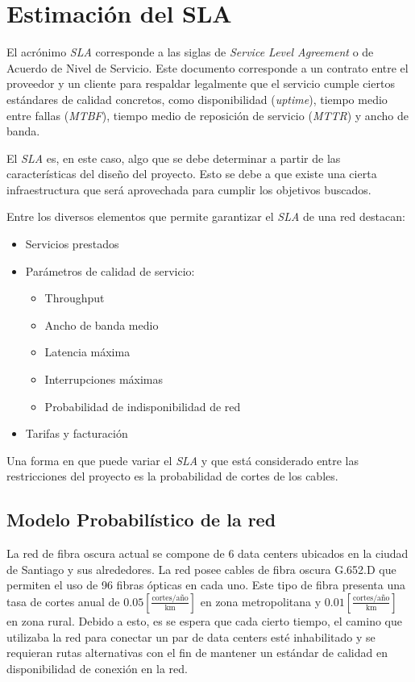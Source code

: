 \section{Estimación del SLA}
\label{sec:SLA}

El acrónimo \emph{SLA} corresponde a las siglas de \emph{Service Level
Agreement} o de Acuerdo de Nivel de Servicio. Este documento corresponde 
a un contrato entre el proveedor y un cliente para respaldar legalmente 
que el servicio cumple ciertos estándares de calidad concretos, como 
disponibilidad (\emph{uptime}), tiempo medio entre fallas (\emph{MTBF}),
tiempo medio de reposición de servicio (\emph{MTTR}) y ancho de banda.

El \emph{SLA} es, en este caso, algo que se debe determinar a partir de 
las características del diseño del proyecto. Esto se debe a que existe 
una cierta infraestructura que será aprovechada para cumplir los 
objetivos buscados.

Entre los diversos elementos que permite garantizar el \emph{SLA} de
una red destacan:
\begin{itemize}
\item Servicios prestados
\item Parámetros de calidad de servicio:
  \begin{itemize}
  \item Throughput
  \item Ancho de banda medio
  \item Latencia máxima
  \item Interrupciones máximas
  \item Probabilidad de indisponibilidad de red
  \end{itemize}
\item Tarifas y facturación
\end{itemize}

Una forma en que puede variar el \emph{SLA} y que está considerado
entre las restricciones del proyecto es la probabilidad de cortes de
los cables.

\subsection{Modelo Probabilístico de la red}

La red de fibra oscura actual se compone de 6 data centers ubicados 
en la ciudad de Santiago y sus alrededores. La red posee cables de 
fibra oscura G.652.D que permiten el uso de 96 fibras ópticas en cada 
uno. Este tipo de fibra presenta una tasa de cortes anual de $0.05 
[\frac{\text{cortes}/\text{año}}{\text{km}}]$ en zona metropolitana y 
$0.01 [\frac{\text{cortes}/\text{año}}{\text{km}}]$ en zona rural. 
Debido a esto, es se espera que cada cierto tiempo, el camino que 
utilizaba la red para conectar un par de data centers esté 
inhabilitado y se requieran rutas alternativas con el fin de mantener 
un estándar de calidad en disponibilidad de conexión en la red.

